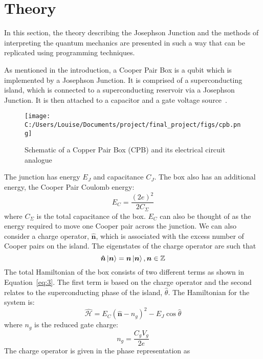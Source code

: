 \documentclass[11pt]{article}
\newcommand*{\hatH}{\hat{\mathcal{H}}}
\begin{document}
\section{Theory}
In this section, the theory describing the Josephson Junction and the methods of interpreting the quantum mechanics are presented in such a way that can be replicated using programming techniques.

As mentioned in the introduction, a Cooper Pair Box is a qubit which is implemented by a Josephson Junction. It is comprised of a superconducting island, which is connected to a superconducting reservoir via a Josephson Junction. It is then attached to a capacitor and a gate voltage source~\cite{cottetImplementationQuantumBit2002}.
\begin{figure}[ht]
\centering
\texttt{[image: C:/Users/Louise/Documents/project/final\_project/figs/cpb.png]}
\caption{Schematic of a Copper Pair Box (CPB) and its electrical circuit analogue}
\label{fig:picture4}
\end{figure}
The junction has energy $E_J$ and capacitance $C_J$. The box also has an additional energy, the Cooper Pair Coulomb energy:
\begin{equation} \label{eq:1}
E_C = \frac{(2e)^2}{2C_\Sigma}
\end{equation}
where $C_\Sigma$ is the total capacitance of the box. $E_C$ can also be thought of as the energy required to move one Cooper pair across the junction. We can also consider a charge operator, $\boldsymbol{\hat{n}}$, which is associated with the excess number of Cooper pairs on the island. The eigenstates of the charge operator are such that
\begin{equation} \label{eq:2}
\boldsymbol{\hat{n}}\ket{\boldsymbol{n}} = \boldsymbol{n}\ket{\boldsymbol{n}}, \boldsymbol{n} \in \mathbb{Z}
\end{equation}
The total Hamiltonian of the box consists of two different terms as shown in Equation~\ref{eq:3}. The first term is based on the charge operator and the second relates to the superconducting phase of the island, $\hat{\theta}$. The Hamiltonian for the system is:
\begin{equation} \label{eq:3}
\hatH = E_C (\boldsymbol{\hat{n}} - n_g)^2 - E_J \cos{\hat{\theta}}
\end{equation}
where $n_g$ is the reduced gate charge:
\begin{equation} \label{eq:4}
n_g = \frac{C_g V_g}{2e}
\end{equation}
The charge operator is given in the phase representation as
\end{document}
